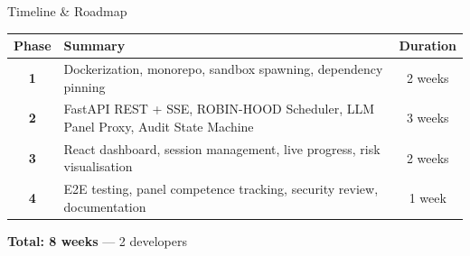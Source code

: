 \documentclass[11pt, aspectratio=169]{beamer}
\begin{document}
\begin{frame}{Timeline \& Roadmap}
  \centering
  \renewcommand{\arraystretch}{1.3}
  \begin{tabularx}{\textwidth}{c Y c}
    \toprule
    \textbf{Phase} & \textbf{Summary} & \textbf{Duration} \\
    \midrule
    \textbf{1} &
    Dockerization, monorepo, sandbox spawning,
    dependency pinning &
    2 weeks \\

    \textbf{2} &
    FastAPI REST + SSE, \alert{ROBIN-HOOD Scheduler},
    \alert{LLM Panel Proxy}, Audit State Machine &
    3 weeks \\

    \textbf{3} &
    React dashboard, session management, live
    progress, risk visualisation &
    2 weeks \\

    \textbf{4} &
    E2E testing, \alert{panel competence tracking},
    security review, documentation &
    1 week \\
    \bottomrule
  \end{tabularx}

  \vspace{0.5cm}
  \textbf{Total: 8 weeks} --- 2 developers
\end{frame}
\end{document}

